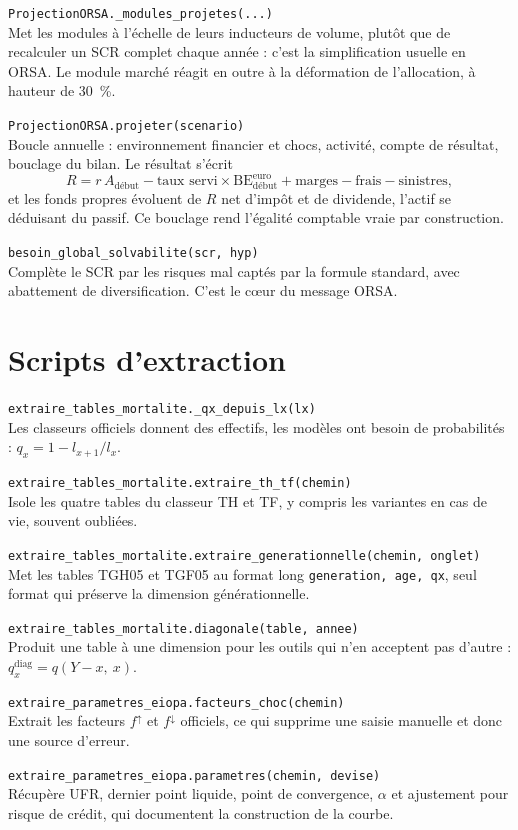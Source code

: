 \documentclass[10pt,a4paper]{article}
\newcommand{\fn}[2]{\par\smallskip\textcolor{bleufonce}{\texttt{#1}}\\ #2\par}
\begin{document}
\fn{ProjectionORSA.\_modules\_projetes(...)}{Met les modules à l'échelle de leurs inducteurs de
volume, plutôt que de recalculer un SCR complet chaque année : c'est la simplification usuelle en
ORSA. Le module marché réagit en outre à la déformation de l'allocation, à hauteur de
\qty{30}{\percent}.}

\fn{ProjectionORSA.projeter(scenario)}{Boucle annuelle : environnement financier et chocs,
activité, compte de résultat, bouclage du bilan. Le résultat s'écrit
\[
R = r\,A_{\text{début}} - \text{taux servi} \times \mathrm{BE}^{\text{euro}}_{\text{début}}
+ \text{marges} - \text{frais} - \text{sinistres},
\]
et les fonds propres évoluent de $R$ net d'impôt et de dividende, l'actif se déduisant du passif.
Ce bouclage rend l'égalité comptable vraie par construction.}

\fn{besoin\_global\_solvabilite(scr, hyp)}{Complète le SCR par les risques mal captés par la
formule standard, avec abattement de diversification. C'est le cœur du message ORSA.}

\section{Scripts d'extraction}

\fn{extraire\_tables\_mortalite.\_qx\_depuis\_lx(lx)}{Les classeurs officiels donnent des
effectifs, les modèles ont besoin de probabilités : $q_x = 1 - l_{x+1}/l_x$.}

\fn{extraire\_tables\_mortalite.extraire\_th\_tf(chemin)}{Isole les quatre tables du classeur TH
et TF, y compris les variantes en cas de vie, souvent oubliées.}

\fn{extraire\_tables\_mortalite.extraire\_generationnelle(chemin, onglet)}{Met les tables TGH05
et TGF05 au format long \texttt{generation, age, qx}, seul format qui préserve la dimension
générationnelle.}

\fn{extraire\_tables\_mortalite.diagonale(table, annee)}{Produit une table à une dimension pour
les outils qui n'en acceptent pas d'autre : $q^{\text{diag}}_x = q(Y-x,\ x)$.}

\fn{extraire\_parametres\_eiopa.facteurs\_choc(chemin)}{Extrait les facteurs $f^{\uparrow}$ et
$f^{\downarrow}$ officiels, ce qui supprime une saisie manuelle et donc une source d'erreur.}

\fn{extraire\_parametres\_eiopa.parametres(chemin, devise)}{Récupère UFR, dernier point liquide,
point de convergence, $\alpha$ et ajustement pour risque de crédit, qui documentent la
construction de la courbe.}
\end{document}
